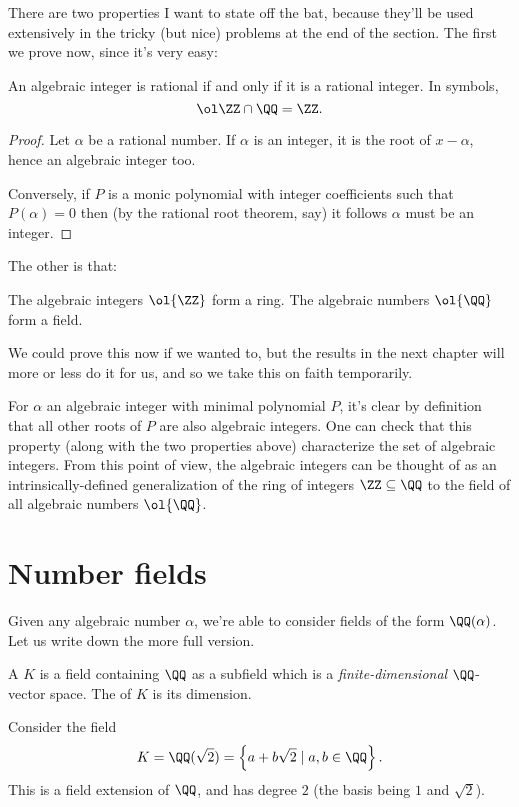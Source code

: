 There are two properties I want to state off the bat,
because they'll be used extensively in the tricky
(but nice) problems at the end of the section.
The first we prove now, since it's very easy:
\begin{proposition}
	An algebraic integer is rational
	if and only if it is a rational integer.
	In symbols, \[ \ol\ZZ \cap \QQ = \ZZ. \]
\end{proposition}
\begin{proof}
	Let $\alpha$ be a rational number.
	If $\alpha$ is an integer, it is the root of $x-\alpha$,
	hence an algebraic integer too.

	Conversely, if $P$ is a monic polynomial with integer
	coefficients such that $P(\alpha) = 0$ then
	(by the rational root theorem, say)
	it follows $\alpha$ must be an integer.
\end{proof}
The other is that:
\begin{proposition}
	The algebraic integers $\ol{\ZZ}$ form a ring.
	The algebraic numbers $\ol{\QQ}$ form a field.
\end{proposition}
We could prove this now if we wanted to,
but the results in the next chapter will more or less
do it for us, and so we take this on faith temporarily.

\begin{remark}
  For $\alpha$ an algebraic integer with minimal 
  polynomial $P$, it's clear by definition that all 
  other roots of $P$ are also algebraic integers. One 
  can check that this property (along with the two 
  properties above) characterize the set of algebraic
  integers. From this point of view, the algebraic
  integers can be thought of as an intrinsically-defined 
  generalization of the ring of integers $\ZZ \subseteq 
  \QQ$ to the field of all algebraic numbers $\ol{\QQ}$. 
\end{remark}

\section{Number fields}

Given any algebraic number $\alpha$,
we're able to consider fields of the form $\QQ(\alpha)$.
Let us write down the more full version.

\begin{definition}
	A  $K$ is a field containing $\QQ$ as a subfield
	which is a \emph{finite-dimensional} $\QQ$-vector space.
	The  of $K$ is its dimension.
\end{definition}
\begin{example}
	Consider the field
	\[ K = \QQ(\sqrt2) = \left\{ a+b\sqrt2 \mid a,b \in \QQ \right\}. \]
	This is a field extension of $\QQ$,
	and has degree $2$ (the basis being $1$ and $\sqrt2$).
\end{example}

